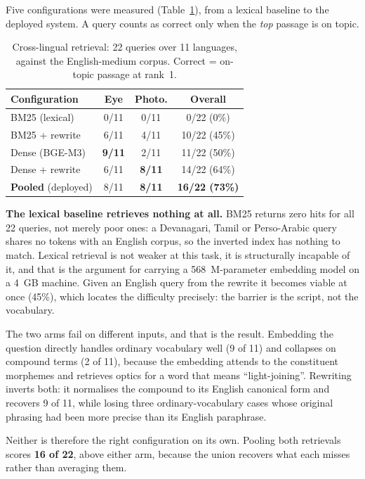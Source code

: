 \documentclass[conference]{IEEEtran}
\begin{document}
Five configurations were measured (Table~\ref{tab:crosslingual}), from a lexical baseline to the deployed system. A query counts as correct only when the \emph{top} passage is on topic.

\begin{table}[htbp]
\caption{Cross-lingual retrieval: 22 queries over 11 languages, against the English-medium corpus. Correct = on-topic passage at rank~1.}
\label{tab:crosslingual}
\centering
\small
\begin{tabular}{@{}lccc@{}}
\toprule
\textbf{Configuration} & \textbf{Eye} & \textbf{Photo.} & \textbf{Overall} \\
\midrule
BM25 (lexical)            & 0/11 & 0/11 & 0/22 \phantom{0}(0\%) \\
BM25 + rewrite            & 6/11 & 4/11 & 10/22 (45\%) \\
Dense (BGE-M3)            & \textbf{9/11} & 2/11 & 11/22 (50\%) \\
Dense + rewrite           & 6/11 & \textbf{8/11} & 14/22 (64\%) \\
\textbf{Pooled} (deployed) & 8/11 & \textbf{8/11} & \textbf{16/22 (73\%)} \\
\bottomrule
\end{tabular}
\end{table}

\textbf{The lexical baseline retrieves nothing at all.} BM25 returns zero hits for all 22 queries, not merely poor ones: a Devanagari, Tamil or Perso-Arabic query shares no tokens with an English corpus, so the inverted index has nothing to match. Lexical retrieval is not weaker at this task, it is structurally incapable of it, and that is the argument for carrying a 568~M-parameter embedding model on a 4~GB machine. Given an English query from the rewrite it becomes viable at once (45\%), which locates the difficulty precisely: the barrier is the script, not the vocabulary.

The two arms fail on different inputs, and that is the result. Embedding the question directly handles ordinary vocabulary well (9 of 11) and collapses on compound terms (2 of 11), because the embedding attends to the constituent morphemes and retrieves optics for a word that means ``light-joining''. Rewriting inverts both: it normalises the compound to its English canonical form and recovers 9 of 11, while losing three ordinary-vocabulary cases whose original phrasing had been more precise than its English paraphrase.

Neither is therefore the right configuration on its own. Pooling both retrievals scores \textbf{16 of 22}, above either arm, because the union recovers what each misses rather than averaging them.
\end{document}
